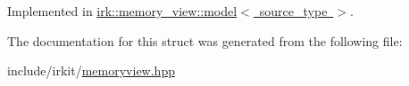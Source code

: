 Implemented in \mbox{\hyperlink{classirk_1_1memory__view_1_1model_a88bdaaf00f71b733bb67ea912ed78251}{irk\+::memory\+\_\+view\+::model$<$ source\+\_\+type $>$}}.



The documentation for this struct was generated from the following file\+:\begin{DoxyCompactItemize}
\item 
include/irkit/\mbox{\hyperlink{memoryview_8hpp}{memoryview.\+hpp}}\end{DoxyCompactItemize}
